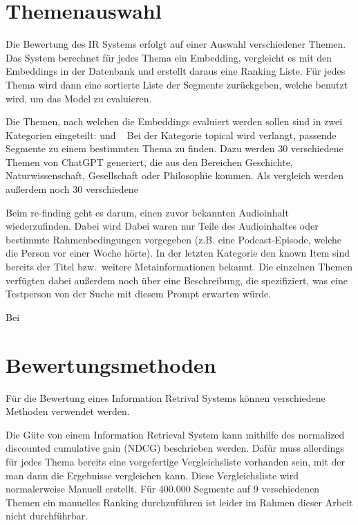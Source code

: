 \section{Themenauswahl}

Die Bewertung des IR Systems erfolgt auf einer Auswahl verschiedener Themen.
Das System berechnet für jedes Thema ein Embedding, vergleicht es mit den Embeddings in der Datenbank und erstellt daraus eine Ranking Liste.
Für jedes Thema wird dann eine sortierte Liste der Segmente zurückgeben, welche benutzt wird, um das Model zu evaluieren.

Die Themen, nach welchen die Embeddings evaluiert werden sollen sind in zwei Kategorien eingeteilt:
 und ~\cite{jones2021}
Bei der Kategorie topical wird verlangt, passende Segmente zu einem bestimmten Thema zu finden.
Dazu werden 30 verschiedene Themen von ChatGPT generiert, die aus den Bereichen Geschichte, Naturwissenschaft, Gesellschaft oder Philosophie kommen.
Als vergleich werden außerdem noch 30 verschiedene 


Beim re-finding geht es darum, einen zuvor bekannten Audioinhalt wiederzufinden.
Dabei wird 
Dabei waren nur Teile des Audioinhaltes oder bestimmte Rahmenbedingungen vorgegeben (z.B. eine Podcast-Episode, welche die Person vor einer Woche hörte).
In der letzten Kategorie den known Item sind bereits der Titel bzw.\ weitere Metainformationen bekannt.
Die einzelnen Themen verfügten dabei außerdem noch über eine Beschreibung, die spezifiziert, was eine Testperson von der Suche mit diesem Prompt erwarten würde.


Bei



\section{Bewertungsmethoden}


Für die Bewertung eines Information Retrival Systems können verschiedene Methoden verwendet werden.


Die Güte von einem Information Retrieval System kann mithilfe des normalized discounted cumulative gain (NDCG) beschrieben werden. 
Dafür muss allerdings für jedes Thema bereits eine vorgefertige Vergleichsliste vorhanden sein, mit der man dann die Ergebnisse vergleichen kann.
Diese Vergleichsliste wird normalerweise Manuell erstellt.
Für 400.000 Segmente auf 9 verschiedenen Themen ein manuelles Ranking durchzuführen ist leider im Rahmen dieser Arbeit nicht durchführbar.

